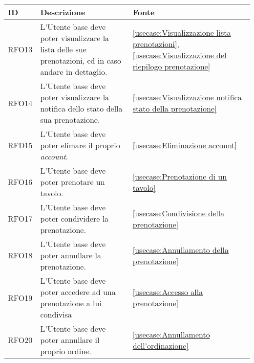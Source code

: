 \begin{table}[H]
	\renewcommand{\arraystretch}{1.5}
	\centering
	\begin{tabularx}{\textwidth}{l|X|p{2cm}}
		\textbf{ID} & \textbf{Descrizione}                                                                                           & \textbf{Fonte}                                                                                                     \\
		\hline
		RFO13       & L'Utente base deve poter visualizzare la lista delle sue prenotazioni, ed in caso andare in dettaglio.         & \autoref{usecase:Visualizzazione lista prenotazioni}, \autoref{usecase:Visualizzazione del riepilogo prenotazione} \\
		\hline
		RFO14       & L'Utente base deve poter visualizzare la notifica dello stato della sua prenotazione.                          & \autoref{usecase:Visualizzazione notifica stato della prenotazione}                                                \\
		\hline
		RFD15       & L'Utente base deve poter elimare il proprio \textit{account}.                                                  & \autoref{usecase:Eliminazione account}                                                                             \\
		\hline
		RFO16       & L'Utente base deve poter prenotare un tavolo.                                                                  & \autoref{usecase:Prenotazione di un tavolo}                                                                        \\
		\hline
		RFO17       & L'Utente base deve poter condividere la prenotazione.                                                          & \autoref{usecase:Condivisione della prenotazione}                                                                  \\
		\hline
		RFO18       & L'Utente base deve poter annullare la prenotazione.                                                            & \autoref{usecase:Annullamento della prenotazione}                                                                  \\
		\hline
		RFO19       & L'Utente base deve poter accedere ad una prenotazione a lui condivisa											 & \autoref{usecase:Accesso alla prenotazione}                                                                        \\
		\hline
		RFO20       & L'Utente base deve poter annullare il proprio ordine.                                                          & \autoref{usecase:Annullamento dell'ordinazione}                                                                    \\

\end{tabularx}
\end{table}
